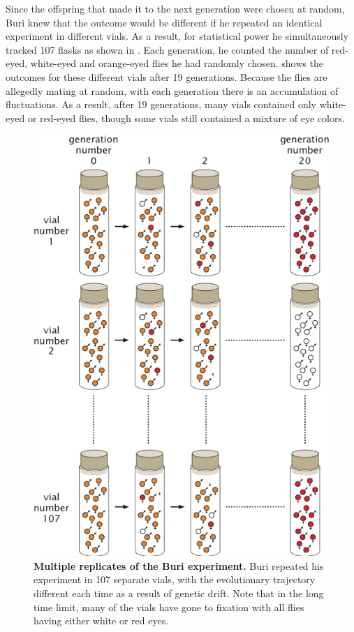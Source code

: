 Since the offspring that made it to the next generation were chosen at random,
Buri knew that the outcome would be different if he repeated an identical
experiment in different vials. As a result, for statistical power he
simultaneously tracked 107 flasks as shown in .
Each generation, he counted the number of red-eyed, white-eyed and orange-eyed
flies he had randomly chosen.  shows the outcomes
for these different vials after 19 generations. Because the flies are allegedly
mating at random, with each generation there is an accumulation of
fluctuations. As a result, after 19 generations, many vials contained only
white-eyed or red-eyed flies, though some vials still contained a mixture of
eye colors.

\begin{figure}[h!]
\centering \includegraphics[scale=0.7]
  {../fig/drift_langevin/02_01_02_buri_generations.png}
  \caption{\textbf{Multiple replicates of the Buri experiment.}  Buri repeated
  his experiment in 107 separate vials, with the evolutionary trajectory
  different each time as a result of genetic drift.  Note that in the long time
  limit, many of the vials have gone to fixation with all flies having either
  white or red eyes.}
\label{fig_buri_generations}
\end{figure}


